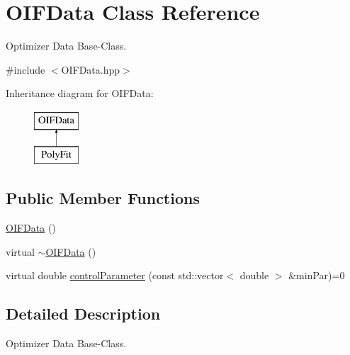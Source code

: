 \hypertarget{classOIFData}{
\section{OIFData Class Reference}
\label{d1/d4f/classOIFData}
}


Optimizer Data Base-\/Class.  




{\ttfamily \#include $<$OIFData.hpp$>$}

Inheritance diagram for OIFData:\begin{figure}[H]
\begin{center}
\leavevmode
\includegraphics[height=2.000000cm]{d1/d4f/classOIFData}
\end{center}
\end{figure}
\subsection*{Public Member Functions}
\begin{DoxyCompactItemize}
\item 
\hyperlink{classOIFData_a11151212f0897c14c0b81b0b55939473}{OIFData} ()
\item 
virtual \hyperlink{classOIFData_ab7126c43d4911e022db3033996fc345c}{$\sim$OIFData} ()
\item 
virtual double \hyperlink{classOIFData_adb5b2e9a28b1767f07ccb8737211ff4f}{controlParameter} (const std::vector$<$ double $>$ \&minPar)=0
\end{DoxyCompactItemize}


\subsection{Detailed Description}
Optimizer Data Base-\/Class. 

